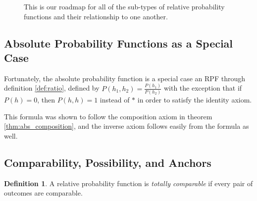 \documentclass[twoside]{article}
\theoremstyle{plain}%
\theoremstyle{definition}
\newtheorem{definition}{Definition}[section]
\theoremstyle{remark}
\begin{document}
\begin{figure}
\caption{This is our roadmap for all of the sub-types of relative probability functions and their relationship to one another. }
\label{fig:flow_chart}
\end{figure}

\subsection{Absolute Probability Functions as a Special Case}

Fortunately, the absolute probability function is a special case an RPF through definition \ref{def:ratio}, defined by \(P(h_1, h_2) = \frac{P(h_1)}{P(h_2)}\) with the exception that if \(P(h) = 0\), then \(P(h, h) = 1\) instead of \(\ast\) in order to satisfy the identity axiom.

This formula was shown to follow the composition axiom in theorem \ref{thm:abs_composition}, and the inverse axiom follows easily from the formula as well.

\subsection{Comparability, Possibility, and Anchors}

\begin{definition}
\label{def:totally_comparable}
A relative probability function is \textit{totally comparable} if every pair of outcomes are comparable.
\end{definition}
\end{document}
